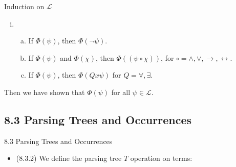 \begin{frame}{Induction on $\mathcal{L}$}
\begin{itemize}
\begin{enumerate}[(i)]
\begin{enumerate}[(a)]
			\end{enumerate}
			
			\item \begin{enumerate}[(a)]
			
			\item If $\Phi(\psi)$, then $\Phi(\neg\psi)$.

			\item If $\Phi(\psi)$ and $\Phi(\chi)$, then $\Phi((\psi\circ\chi))$, for $\circ=\land,\lor,\to,\leftrightarrow$.
			
			\item If $\Phi(\psi)$, then $\Phi(Qx\psi)$ for $Q=\forall,\exists$.

		
		\end{enumerate}
		\end{enumerate}
		Then we have shown that $\Phi(\psi)$ for all $\psi\in\mathcal{L}$.
	
	\end{itemize}


\end{frame}

\subsection{8.3 Parsing Trees and Occurrences}
\begin{frame}{8.3 Parsing Trees and Occurrences}

	\begin{itemize}%
	\itemsep=16pt
	
		\item (8.3.2) We define the parsing tree $T$ operation on terms:

\medskip

\begin{center}
\end{center}

	
	\end{itemize}

\end{frame}

